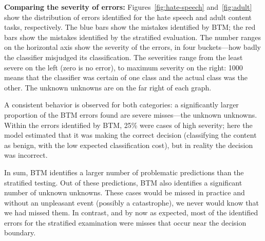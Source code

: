\textbf{Comparing the severity of errors:} Figures~\ref{fig:hate-speech} and~\ref{fig:adult} show the distribution of errors identified for the hate speech and adult content tasks, respectively.  The blue bars show the mistakes identified by BTM; the red bars show the mistakes identified by the stratified evaluation.   The number ranges on the horizontal axis show the severity of the errors, in four buckets---how badly the classifier misjudged its classification.  The severities range from the least severe on the left (zero is no error), to maximum severity on the right: 1000 means that the classifier was certain of one class and the actual class was the other.  The unknown unknowns are on the far right of each graph.

A consistent behavior is observed for both categories: a significantly larger proportion of the BTM errors found are severe misses---the unknown unknowns. Within the errors identified by BTM, 25\% were cases of high severity; here the model estimated that it was making the correct decision (classifying the content as benign, with the low expected classification cost), but in reality the decision was incorrect. 

In sum, BTM identifies a larger number of problematic predictions than the stratified testing. Out of these predictions, BTM also identifies a significant number of unknown unknowns.  These cases would be missed in practice and without an unpleasant event (possibly a catastrophe), we never would know that we had missed them. In contrast, and by now as expected, most of the identified 
errors for the stratified examination were misses that occur near the decision boundary.

\begin{figure}[t]
\centering
{}
\label{fig:results}
\end{figure}


